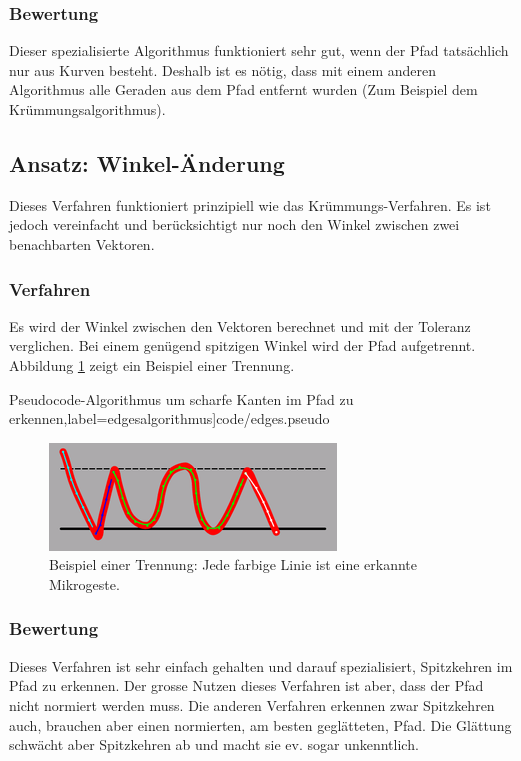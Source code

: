 \subsubsection{Bewertung}
Dieser spezialisierte Algorithmus funktioniert sehr gut, wenn der Pfad tatsächlich nur aus Kurven besteht. Deshalb ist es nötig, dass mit einem anderen Algorithmus alle Geraden aus dem Pfad entfernt wurden (Zum Beispiel dem Krümmungsalgorithmus).


\subsection{Ansatz: Winkel-Änderung}

Dieses Verfahren funktioniert prinzipiell wie das Krümmungs-Verfahren. Es ist jedoch vereinfacht und berücksichtigt nur noch den Winkel zwischen zwei benachbarten Vektoren.

\subsubsection{Verfahren}
Es wird der Winkel zwischen den Vektoren berechnet und mit der Toleranz verglichen. Bei einem genügend spitzigen Winkel wird der Pfad aufgetrennt. Abbildung \ref{kanten_trennung} zeigt ein Beispiel einer Trennung.

{Pseudocode-Algorithmus um scharfe Kanten im Pfad zu erkennen},label=edgesalgorithmus]{code/edges.pseudo}

\begin{figure}[h!]
  \centering
    \includegraphics[scale=0.75]{./img/edges_beispiel.png}
  \caption{Beispiel einer Trennung: Jede farbige Linie ist eine erkannte Mikrogeste.}
  \label{kanten_trennung}
\end{figure}

\subsubsection{Bewertung}
Dieses Verfahren ist sehr einfach gehalten und darauf spezialisiert, Spitzkehren im Pfad zu erkennen. Der grosse Nutzen dieses Verfahren ist aber, dass der Pfad nicht normiert werden muss. Die anderen Verfahren erkennen zwar Spitzkehren auch, brauchen aber einen normierten, am besten geglätteten, Pfad. Die Glättung schwächt aber Spitzkehren ab und macht sie ev. sogar unkenntlich.  

